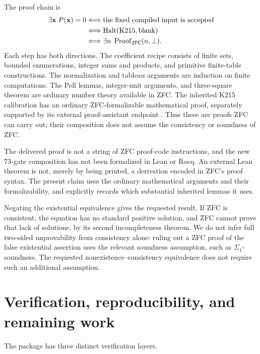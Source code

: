 \documentclass[11pt]{article}
\theoremstyle{remark}\newtheorem{remark}[theorem]{Remark}
\begin{document}
The proof chain is
\[
 \begin{aligned}
 \exists\mathbf x\;P(\mathbf x)=0
 &\Longleftrightarrow\text{the fixed compiled input is accepted}\\
 &\Longleftrightarrow\operatorname{Halt}(\mathrm{K215},\mathrm{blank})\\
 &\Longleftrightarrow\exists n\;\operatorname{Proof}_{\mathsf{ZFC}}(n,\bot).
 \end{aligned}
\]
Each step has both directions. The coefficient recipe consists of
finite sets, bounded enumerations, integer sums and products, and
primitive finite-table constructions. The normalization and tableau
arguments are induction on finite computations. The Pell lemmas,
integer-unit arguments, and three-square theorem are ordinary
number theory available in ZFC. The inherited K215 calibration has
an ordinary ZFC-formalizable mathematical proof, separately supported
by its external proof-assistant endpoint \cite{K215,Endpoint}.
Thus these are proofs ZFC can carry out; their composition does not
assume the consistency or soundness of ZFC.

The delivered proof is not a string of ZFC proof-code instructions,
and the new $73$-gate composition has not been formalized in Lean
or Rocq. An external Lean theorem is not, merely by being printed,
a derivation encoded in ZFC's proof syntax. The present claim uses
the ordinary mathematical arguments and their formalizability,
and explicitly records which substantial inherited lemmas it uses.

Negating the existential equivalence gives the requested result.
If ZFC is consistent, the equation has no standard positive solution,
and ZFC cannot prove that lack of solutions, by its second
incompleteness theorem. We do not infer full two-sided
unprovability from consistency alone: ruling out a ZFC proof of
the false existential assertion uses the relevant soundness
assumption, such as $\Sigma_1$-soundness. The requested
nonexistence--consistency equivalence does not require such an
additional assumption.

\section{Verification, reproducibility, and remaining work}\label{sec:verify}

The package has three distinct verification layers.
\end{document}
